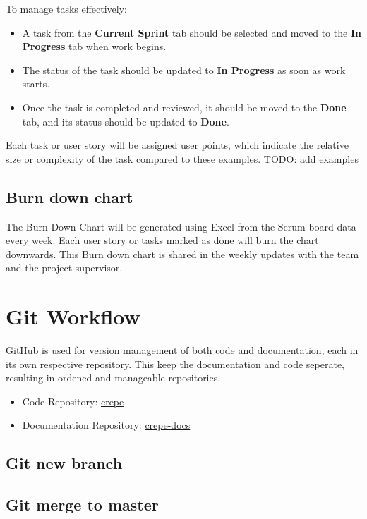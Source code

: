 \documentclass{projdoc}
\begin{document}
\noindent
To manage tasks effectively:
\begin{itemize}
    \item A task from the \textbf{Current Sprint} tab should be selected and moved to the \textbf{In Progress} tab when work begins. 
    \item The status of the task should be updated to \textbf{In Progress} as soon as work starts.
    \item Once the task is completed and reviewed, it should be moved to the \textbf{Done} tab, and its status should be updated to \textbf{Done}.
\end{itemize}

\noindent
Each task or user story will be assigned user points, which indicate the relative size or complexity of the task compared to these examples.
TODO: add examples

\subsection{Burn down chart}
The Burn Down Chart will be generated using Excel from the Scrum board data every week.
Each user story or tasks marked as done will burn the chart downwards.
This Burn down chart is shared in the weekly updates with the team and the project supervisor.
\newpage

\section{Git Workflow}

GitHub is used for version management of both code and documentation, each in its own respective repository.
This keep the documentation and code seperate, resulting in ordened and manageable repositories. 

\begin{itemize}
    \item Code Repository: \href{https://github.com/lonkaars/crepe}{crepe}
    \item Documentation Repository: \href{https://github.com/lonkaars/crepe-docs}{crepe-docs}
\end{itemize}

\subsection{Git new branch}
\subsection{Git merge to master}
\newpage
\end{document}

